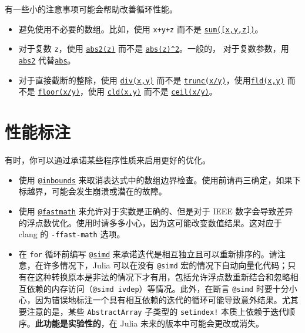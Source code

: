 有一些小的注意事项可能会帮助改善循环性能。



\begin{itemize}
\item 避免使用不必要的数组。比如，使用 \texttt{x+y+z} 而不是 \hyperlink{8666686648688281595}{\texttt{sum([x,y,z])}}。


\item 对于复数 \texttt{z}，使用 \hyperlink{15686257922156163743}{\texttt{abs2(z)}} 而不是 \hyperlink{3804132060389001711}{\texttt{abs(z){\textasciicircum}2}}。一般的， 对于复数参数，用 \hyperlink{15686257922156163743}{\texttt{abs2}} 代替\hyperlink{9614495866226399167}{\texttt{abs}}。


\item 对于直接截断的整除，使用 \hyperlink{8020976424566491334}{\texttt{div(x,y)}} 而不是 \hyperlink{1728363361565303194}{\texttt{trunc(x/y)}}，使用\hyperlink{15067916827074788527}{\texttt{fld(x,y)}} 而不是 \hyperlink{11115257331910840693}{\texttt{floor(x/y)}}，使用 \hyperlink{7922388465305816555}{\texttt{cld(x,y)}} 而不是 \hyperlink{10519509038312853061}{\texttt{ceil(x/y)}}。

\end{itemize}


\hypertarget{3688250407374776658}{}


\section{性能标注}



有时，你可以通过承诺某些程序性质来启用更好的优化。



\begin{itemize}
\item 使用 \hyperlink{9619263577270933060}{\texttt{@inbounds}} 来取消表达式中的数组边界检查。使用前请再三确定，如果下标越界，可能会发生崩溃或潜在的故障。


\item 使用 \hyperlink{8577961464469068114}{\texttt{@fastmath}} 来允许对于实数是正确的、但是对于 IEEE 数字会导致差异的浮点数优化。使用时请多多小心，因为这可能改变数值结果。这对应于 clang 的 \texttt{-ffast-math} 选项。


\item 在 \texttt{for} 循环前编写 \hyperlink{8155428559748374852}{\texttt{@simd}} 来承诺迭代是相互独立且可以重新排序的。请注意，在许多情况下，Julia 可以在没有 \texttt{@simd} 宏的情况下自动向量化代码；只有在这种转换原本是非法的情况下才有用，包括允许浮点数重新结合和忽略相互依赖的内存访问（\texttt{@simd ivdep}）等情况。此外，在断言 \texttt{@simd} 时要十分小心，因为错误地标注一个具有相互依赖的迭代的循环可能导致意外结果。尤其要注意的是，某些 \texttt{AbstractArray} 子类型的 \texttt{setindex!} 本质上依赖于迭代顺序。\textbf{此功能是实验性的}，在 Julia 未来的版本中可能会更改或消失。

\end{itemize}


